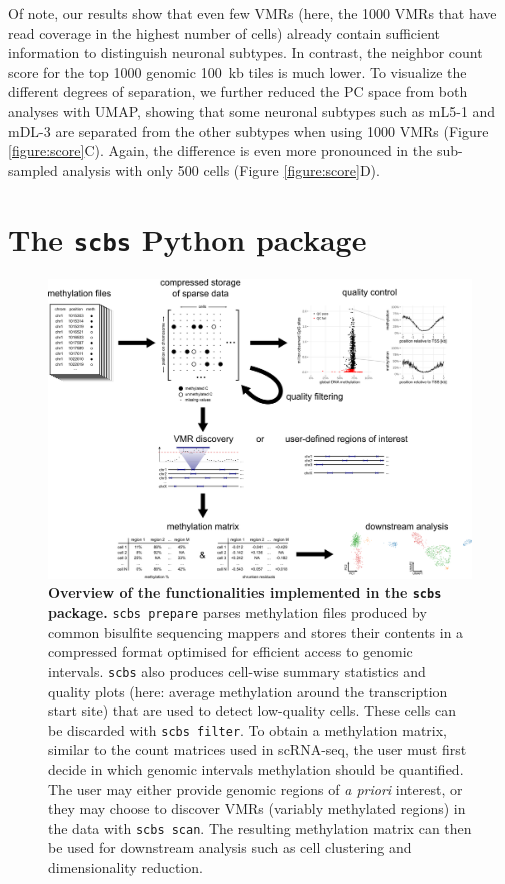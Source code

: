 \documentclass[twocolumn,10pt]{article}
\begin{document}
Of note, our results show that even few VMRs (here, the 1000 VMRs that have read coverage in the highest number of cells) already contain sufficient information to distinguish neuronal subtypes.
In contrast, the neighbor count score for the top 1000 genomic 100~kb tiles is much lower.
To visualize the different degrees of separation, we further reduced the PC space from both analyses with UMAP, showing that some neuronal subtypes such as mL5-1 and mDL-3 are separated from the other subtypes when using 1000 VMRs (Figure \ref{figure:score}C).
Again, the difference is even more pronounced in the sub-sampled analysis with only 500 cells (Figure \ref{figure:score}D).

\section{The \texttt{scbs} Python package}

\begin{figure}[t]
    \begin{center}
        \includegraphics[width=.8\textwidth]{figures/Fig_workflow.png}
    \end{center}
    \caption{\small \textbf{Overview of the functionalities implemented in the \texttt{scbs} package.}
        \texttt{scbs prepare} parses methylation files produced by common bisulfite sequencing mappers and stores their contents in a compressed format optimised for efficient access to genomic intervals.
        \texttt{scbs} also produces cell-wise summary statistics and quality plots (here: average methylation around the transcription start site) that are used to detect low-quality cells.
        These cells can be discarded with \texttt{scbs filter}.
        To obtain a methylation matrix, similar to the count matrices used in scRNA-seq, the user must first decide in which genomic intervals methylation should be quantified.
        The user may either provide genomic regions of \emph{a priori} interest, or they may choose to discover VMRs (variably methylated regions) in the data with \texttt{scbs scan}.
        The resulting methylation matrix can then be used for downstream analysis such as cell clustering and dimensionality reduction.
    }
    \label{workflow}
\end{figure}
\end{document}
